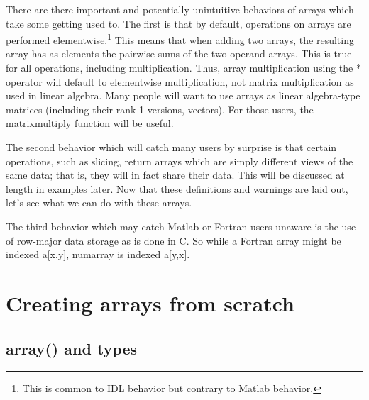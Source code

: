 There are there important and potentially unintuitive behaviors of
 arrays which take some getting used to. The first is that by
default, operations on arrays are performed elementwise.\footnote{This is
common to IDL behavior but contrary to Matlab behavior.}  This means that when
adding two arrays, the resulting array has as elements the pairwise sums of the
two operand arrays.  This is true for all operations, including multiplication.
Thus, array multiplication using the * operator will default to elementwise
multiplication, not matrix multiplication as used in linear algebra. Many
people will want to use arrays as linear algebra-type matrices (including their
rank-1 versions, vectors). For those users, the matrixmultiply
function will be useful.

The second behavior which will catch many users by surprise is that
certain operations, such as slicing, return arrays which are simply different
views of the same data; that is, they will in fact share their data. This will
be discussed at length in examples later.  Now that these definitions and 
warnings are laid out, let's see what we can do with these arrays.

The third behavior which may catch Matlab or Fortran users unaware is the use
of row-major data storage as is done in C.  So while a Fortran array might 
be indexed a[x,y],  numarray is indexed a[y,x].

\newpage
\section{Creating arrays from scratch}
\label{sec:creating-arrays-from}


\subsection{array() and types}
\label{sec:array-types}

